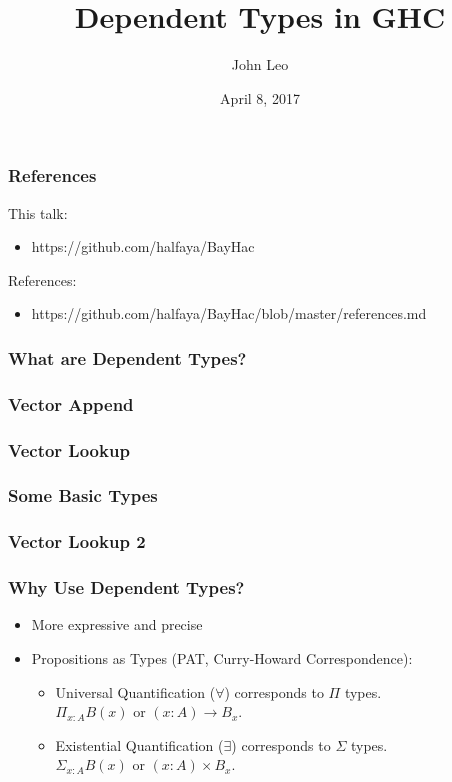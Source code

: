 \documentclass{beamer}
\title{Dependent Types in GHC}
\author{John Leo}
\institute{Halfaya Research}
\date{April 8, 2017}
\begin{document}
 
\frame{\titlepage}
 
\begin{frame}\frametitle{References}
This talk:
\begin{itemize}
\item https://github.com/halfaya/BayHac
\end{itemize}
References:
\begin{itemize}
\item https://github.com/halfaya/BayHac/blob/master/references.md
\end{itemize}
\end{frame}

\begin{frame}\frametitle{What are Dependent Types?}
\end{frame}

\begin{frame}\frametitle{Vector Append}
\end{frame}

\begin{frame}\frametitle{Vector Lookup}
\end{frame}

\begin{frame}\frametitle{Some Basic Types}
\end{frame}

\begin{frame}\frametitle{Vector Lookup 2}
\end{frame}

\begin{frame}\frametitle{Why Use Dependent Types?}
\begin{itemize}
\item More expressive and precise
\item Propositions as Types (PAT, Curry-Howard Correspondence):
\begin{itemize}
\item Universal Quantification ($\forall$) corresponds to $\Pi$ types.\\
  $\Pi_{x : A} B(x)$ or $(x : A) \to B_x$.
\item Existential Quantification ($\exists$) corresponds to $\Sigma$ types.\\
  $\Sigma_{x : A} B(x)$ or $(x : A) \times B_x$.
\end{itemize}
\end{itemize}
\end{frame}
\end{document}

